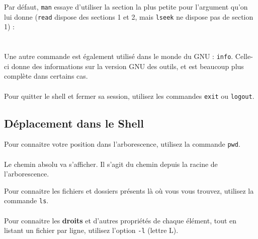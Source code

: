 Par défaut, \texttt{man} essaye d'utiliser la section la plus petite pour l'argument qu'on lui donne (\texttt{read} dispose des sections 1 et 2, mais \texttt{lseek} ne dispose pas de section 1) :\\

\\
\\

Une autre commande est également utilisé dans le monde du GNU : \texttt{info}.
Celle-ci donne des informations sur la version GNU des outils, et est beaucoup plus complète dans certains cas.\\

\\

Pour quitter le shell et fermer sa session, utilisez les commandes \texttt{exit} ou \texttt{logout}.\\

\bigskip


\newpage
\subsection{Déplacement dans le Shell}

\bigskip

Pour connaitre votre position dans l'arborescence, utilisez la commande \texttt{pwd}.\\

\\

Le chemin absolu va s'afficher. Il s'agit du chemin depuis la racine de l'arborescence.\\

\bigskip

Pour connaitre les fichiers et dossiers présents là où vous vous trouvez, utilisez la commande \texttt{ls}.\\

\\

Pour connaitre les \textbf{droits} et d'autres propriétés de chaque élément, tout en listant un fichier par ligne, utilisez l'option \texttt{-l} (lettre L).\\

\\


